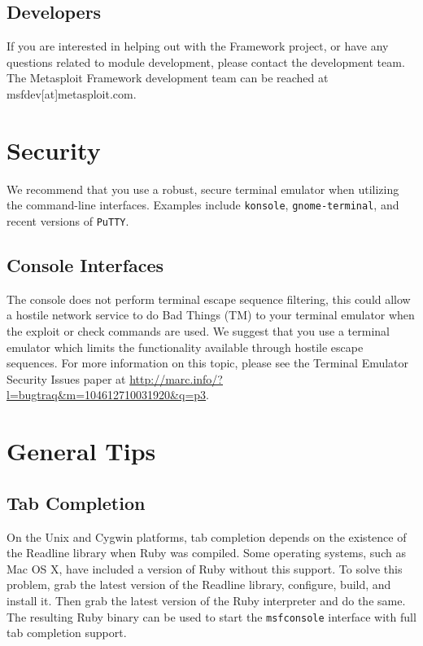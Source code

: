 \documentclass{report}
\begin{document}
\section{Developers}
\par
If you are interested in helping out with the Framework project, or have any
questions related to module development, please contact the development team. The
Metasploit Framework development team can be reached at msfdev[at]metasploit.com.

\pagebreak
\appendix

\pagebreak
\chapter{Security}

\par
We recommend that you use a robust, secure terminal emulator when
utilizing the command-line interfaces. Examples include \texttt{konsole},
\texttt{gnome-terminal}, and recent versions of \texttt{PuTTY}.

	\section{Console Interfaces}
\par
The console does not perform terminal escape sequence filtering, this
could allow a hostile network service to do Bad Things (TM) to your terminal
emulator when the exploit or check commands are used. We suggest that you
use a terminal emulator which limits the functionality available through
hostile escape sequences. For more information on this topic, please see the
Terminal Emulator Security Issues paper at
\url{http://marc.info/?l=bugtraq&m=104612710031920&q=p3}.

\pagebreak
\chapter{General Tips}

	\section{Tab Completion}
	\label{REF-TAB}
\par
On the Unix and Cygwin platforms, tab completion depends on the existence of the Readline 
library when Ruby was compiled. Some operating systems, such as Mac OS X, have included
a version of Ruby without this support. To solve this problem, grab the latest version
of the Readline library, configure, build, and install it. Then grab the latest version
of the Ruby interpreter and do the same. The resulting Ruby binary can be used to start the
\texttt{msfconsole} interface with full tab completion support.
\end{document}
